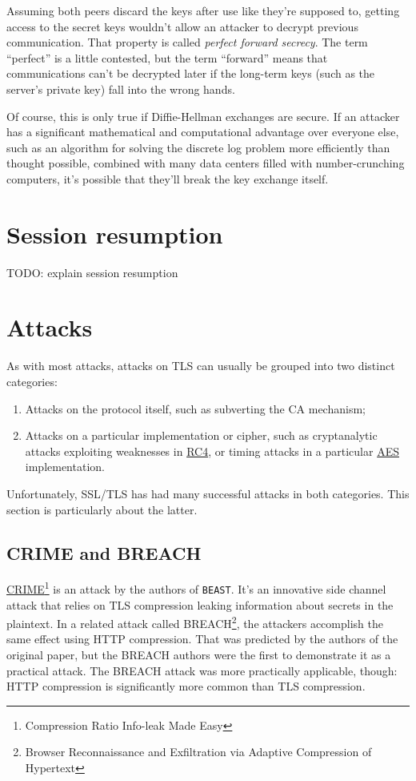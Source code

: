 \documentclass[11pt,ebook,table,dvipsnames]{memoir}
\begin{document}
Assuming both peers discard the keys after use like they're supposed
to, getting access to the secret keys wouldn't allow an attacker to
decrypt previous communication. That property is called \emph{perfect
forward secrecy}. The term \enquote{perfect} is a little contested, but the
term \enquote{forward} means that communications can't be decrypted later if
the long-term keys (such as the server's private key) fall into the
wrong hands.

Of course, this is only true if Diffie-Hellman exchanges are secure.
If an attacker has a significant mathematical and computational
advantage over everyone else, such as an algorithm for solving the
discrete log problem more efficiently than thought possible, combined
with many data centers filled with number-crunching computers, it's
possible that they'll break the key exchange itself.
\section{Session resumption}
\label{sec-3-1-7}

TODO: explain session resumption
\section{Attacks}
\label{sec-3-1-8}

As with most attacks, attacks on TLS can usually be grouped into two
distinct categories:

\begin{enumerate}
\item Attacks on the protocol itself, such as subverting the CA mechanism;
\item Attacks on a particular implementation or cipher, such as
cryptanalytic attacks exploiting weaknesses in \hyperref[RC4]{RC4}, or timing
attacks in a particular \hyperref[AES]{AES} implementation.
\end{enumerate}

Unfortunately, SSL/TLS has had many successful attacks in both
categories. This section is particularly about the latter.

\subsection{\label{CRIME}CRIME and BREACH}
\label{sec-3-1-8-1}

\hyperref[CRIME]{CRIME}\footnote{Compression Ratio Info-leak Made Easy} is an attack by the
authors of \texttt{BEAST}. It's an innovative side channel attack that relies
on TLS compression leaking information about secrets in the plaintext.
In a related attack called BREACH\footnote{Browser Reconnaissance and
Exfiltration via Adaptive Compression of Hypertext}, the attackers
accomplish the same effect using HTTP compression. That was predicted
by the authors of the original paper, but the BREACH authors were the
first to demonstrate it as a practical attack. The BREACH attack was
more practically applicable, though: HTTP compression is
significantly more common than TLS compression.
\end{document}

